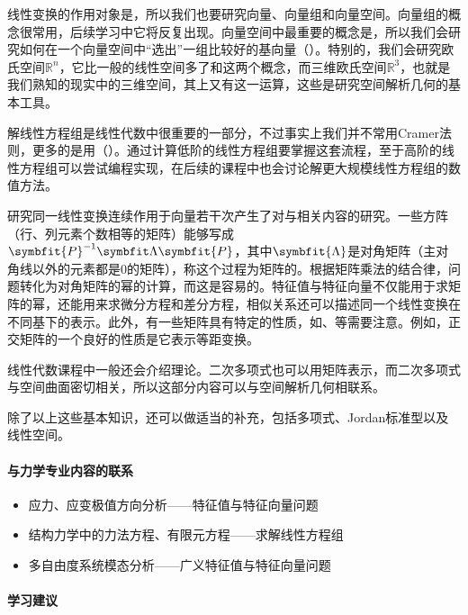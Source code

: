 线性变换的作用对象是，所以我们也要研究向量、向量组和向量空间。向量组的概念很常用，后续学习中它将反复出现。向量空间中最重要的概念是，所以我们会研究如何在一个向量空间中“选出”一组比较好的基向量（）。特别的，我们会研究欧氏空间$\mathbb{R}^n$，它比一般的线性空间多了和这两个概念，而三维欧氏空间$\mathbb{R}^3$，也就是我们熟知的现实中的三维空间，其上又有这一运算，这些是研究空间解析几何的基本工具。

解线性方程组是线性代数中很重要的一部分，不过事实上我们并不常用Cramer法则，更多的是用（）。通过计算低阶的线性方程组要掌握这套流程，至于高阶的线性方程组可以尝试编程实现，在后续的课程中也会讨论解更大规模线性方程组的数值方法。

研究同一线性变换连续作用于向量若干次产生了对与相关内容的研究。一些方阵（行、列元素个数相等的矩阵）能够写成$\symbfit{P}^{-1}\symbfit\Lambda \symbfit{P}$，其中$\symbfit{\Lambda}$是对角矩阵（主对角线以外的元素都是$0$的矩阵），称这个过程为矩阵的。根据矩阵乘法的结合律，问题转化为对角矩阵的幂的计算，而这是容易的。特征值与特征向量不仅能用于求矩阵的幂，还能用来求微分方程和差分方程，相似关系还可以描述同一个线性变换在不同基下的表示。此外，有一些矩阵具有特定的性质，如、等需要注意。例如，正交矩阵的一个良好的性质是它表示等距变换。

线性代数课程中一般还会介绍理论。二次多项式也可以用矩阵表示，而二次多项式与空间曲面密切相关，所以这部分内容可以与空间解析几何相联系。


除了以上这些基本知识，还可以做适当的补充，包括多项式、Jordan标准型以及线性空间。

\paragraph{与力学专业内容的联系}

\begin{itemize}
    \item 应力、应变极值方向分析——特征值与特征向量问题

    \item 结构力学中的力法方程、有限元方程——求解线性方程组

    \item 多自由度系统模态分析——广义特征值与特征向量问题
\end{itemize}

\paragraph{学习建议}

